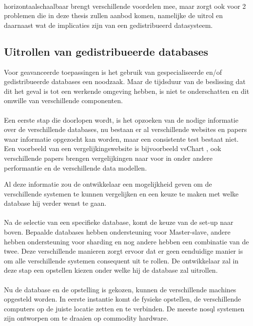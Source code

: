\documentclass{book}
\begin{document}
\paragraph{}
\Gls{horizontaalschaalbaar} brengt verschillende voordelen mee, maar zorgt ook voor 2 problemen die in deze thesis zullen aanbod komen, namelijke de uitrol en daarnaast wat de implicaties zijn van een gedistribueerd datasysteem. 

\subsection{Uitrollen van gedistribueerde databases}
Voor geavanceerde toepassingen is het gebruik van gespecialiseerde en/of gedistribueerde databases een noodzaak. Maar de tijdsduur van de beslissing dat dit het geval is tot een werkende omgeving hebben, is niet te onderschatten en dit omwille van verschillende componenten. 

\paragraph{}Een eerste stap die doorlopen wordt, is het opzoeken van de nodige informatie over de verschillende databases, nu bestaan er al verschillende websites en papers waar informatie opgezocht kan worden, maar een consistente test bestaat niet. Een voorbeeld van een vergelijkingswebsite is bijvoorbeeld vsChart \cite{vsChart}, ook verschillende papers brengen vergelijkingen naar voor in onder andere performantie en de verschillende data modellen. 

Al deze informatie zou de ontwikkelaar een mogelijkheid geven om de verschillende systemen te kunnen vergelijken en een keuze te maken met welke database hij verder wenst te gaan. 

\paragraph{} Na de selectie van een specifieke database, komt de keuze van de set-up naar boven. Bepaalde databases hebben ondersteuning voor Master-slave, andere hebben ondersteuning voor sharding en nog andere hebben een combinatie van de twee. Deze verschillende manieren zorgt ervoor dat er geen eenduidige manier is om alle verschillende systemen consequent uit te rollen. De ontwikkelaar zal in deze stap een opstellen kiezen onder welke hij de database zal uitrollen. 

\paragraph{} Nu de database en de opstelling is gekozen, kunnen de verschillende machines opgesteld worden. In eerste instantie komt de fysieke opstellen, de verschillende computers op de juiste locatie zetten en te verbinden. De meeste \gls{nosql} systemen zijn ontworpen om te draaien op commodity hardware. 
\end{document}
